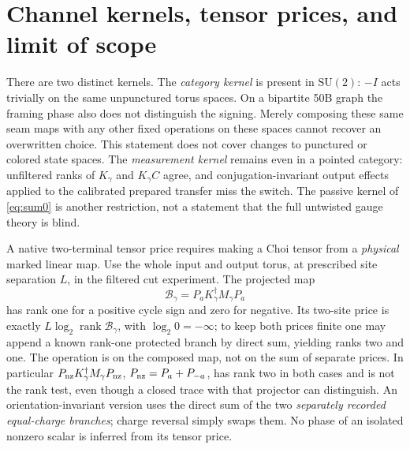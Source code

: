 \documentclass[11pt]{article}
\newcommand{\rank}{\operatorname{rank}}
\begin{document}
\section{Channel kernels, tensor prices, and limit of scope}

There are two distinct kernels. The \emph{category kernel} is present in \(\mathrm{SU}(2)\): \(-I\) acts trivially on the same unpunctured torus spaces. On a bipartite 50B graph the framing phase also does not distinguish the signing. Merely composing these same seam maps with any other fixed operations on these spaces cannot recover an overwritten choice. This statement does not cover changes to punctured or colored state spaces. The \emph{measurement kernel} remains even in a pointed category: unfiltered ranks of \(K_\gamma\) and \(K_\gamma C\) agree, and conjugation-invariant output effects applied to the calibrated prepared transfer miss the switch. The passive kernel of \eqref{eq:sum0} is another restriction, not a statement that the full untwisted gauge theory is blind.

A native two-terminal tensor price \cite{p41,price} requires making a Choi tensor from a \emph{physical} marked linear map. Use the whole input and output torus, at prescribed site separation \(L\), in the filtered cut experiment. The projected map
\[
 \mathcal B_\gamma=P_a K_\gamma^\dagger M_\gamma P_a
\]
has rank one for a positive cycle sign and zero for negative. Its two-site price is exactly \(L\log_2\rank\mathcal B_\gamma\), with \(\log_2 0=-\infty\); to keep both prices finite one may append a known rank-one protected branch by direct sum, yielding ranks two and one. The operation is on the composed map, not on the sum of separate prices. In particular \(P_{\rm nz} K_\gamma^\dagger M_\gamma P_{\rm nz}\), \(P_{\rm nz}=P_a+P_{-a}\), has rank two in both cases and is not the rank test, even though a closed trace with that projector can distinguish. An orientation-invariant version uses the direct sum of the two \emph{separately recorded equal-charge branches}; charge reversal simply swaps them. No phase of an isolated nonzero scalar is inferred from its tensor price.
\end{document}
